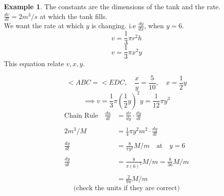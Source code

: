 \documentclass[11pt,a4paper]{article}
\theoremstyle{definition}
\newtheorem{example}[thm]{Example}
\begin{document}
\begin{example}
The constants are the dimensions of the tank and the rate. $\frac{dv}{dt}=2m^3/s$ at which the tank fills.\\
We want the rate at which $y$ is changing. i.e $\frac{dy}{dx}$, when $y=6$.\\


$$v=\frac{1}{3}\pi r^2h$$
$$v=\frac{1}{3}\pi x^2y$$
This equation relate $v,x,y$.\\









\begin{figure}[h!]
\centering
{}
\end{figure}










$$ <ABC= <EDC,\quad  \frac{x}{y}=\frac{5}{10},\quad  x=\frac{1}{2}y$$
$$\implies v=\frac{1}{3}\pi \left(\frac{1}{2}y\right)^2y=\frac{1}{12}\pi y^3$$
\begin{align*}
\text{Chain Rule}\quad  \frac{du}{dt} & =\frac{dv}{dy}\cdot \frac{dy}{dt}\\\\
2m^3/M & = \frac{1}{4}\pi y^2m^2\cdot \frac{dy}{dt}\\\\
\frac{dy}{dt} & = \frac{8}{\pi y^2}M/m \quad  \text{at}\quad  y=6\\\\
\frac{dy}{dt} & = \frac{8}{\pi (6)^2}M/m=\frac{8}{36}M/m\\\\
              & = \frac{2}{9\pi}M/m
\end{align*}
$$\text{(check the units if they are correct)}$$\\











\end{example}
\end{document}
